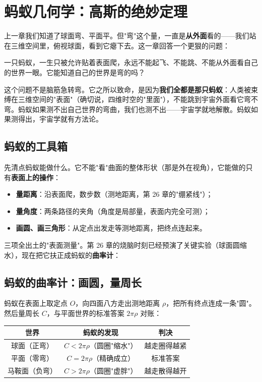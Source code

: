 \chapter{蚂蚁几何学：高斯的绝妙定理}

上一章我们知道了球面弯、平面平。但"弯"这个量，一直是\textbf{从外面}看的——我们站在三维空间里，俯视球面，看到它瘪下去。这一章回答一个更狠的问题：

\begin{kaiwei}
一只蚂蚁，一生只被允许贴着表面爬，永远不能起飞、不能跳、不能从外面看自己的世界一眼。它能知道自己的世界是弯的吗？
\end{kaiwei}

这个问题不是脑筋急转弯。它之所以致命，是因为\textbf{我们全都是那只蚂蚁}：人类被束缚在三维空间的"表面"（确切说，四维时空的"里面"），不能跳到宇宙外面看它弯不弯。蚂蚁如果测不出自己世界的弯曲，我们也测不出——宇宙学就地解散。蚂蚁如果测得出，宇宙学就有方法论。

\section{蚂蚁的工具箱}

先清点蚂蚁能做什么。它不能"看"曲面的整体形状（那是外在视角），它能做的只有\textbf{表面上的操作}：
\begin{itemize}
\item \textbf{量距离}：沿表面爬，数步数（测地距离，第 26 章的"绷紧线"）；
\item \textbf{量角度}：两条路径的夹角（角度是局部量，表面内完全可测）；
\item \textbf{画圆、画三角形}：从定点出发走等测地距离，把终点连起来。
\end{itemize}
三项全出土的"表面测量"。第 26 章的烧脑时刻已经预演了关键实验（球面圆缩水），现在把它扶正成蚂蚁的\textbf{曲率计}：

\section{蚂蚁的曲率计：画圆，量周长}

蚂蚁在表面上取定点 $O$，向四面八方走出测地距离 $\rho$，把所有终点连成一条"圆"。然后量周长 $C$，与平面世界的标准答案 $2\pi\rho$ 对账：

\begin{center}
\begin{tabular}{ccc}
\toprule
世界 & 蚂蚁的发现 & 判决 \\
\midrule
球面（正弯） & $C < 2\pi\rho$（圆圈"缩水"） & 越走圈得越紧 \\
平面（零弯） & $C = 2\pi\rho$（精确成立） & 标准答案 \\
马鞍面（负弯） & $C > 2\pi\rho$（圆圈"虚胖"） & 越走散得越开 \\
\bottomrule
\end{tabular}
\end{center}

